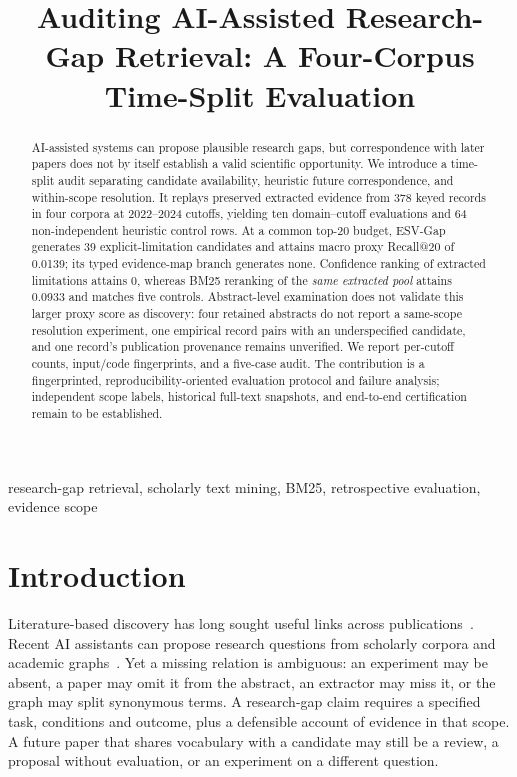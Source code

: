 \documentclass[conference,a4paper]{IEEEtran}
\title{Auditing AI-Assisted Research-Gap Retrieval: A Four-Corpus Time-Split Evaluation}
\author{\IEEEauthorblockN{L\^e Anh H\`oa}
\IEEEauthorblockA{FPT University, Vietnam\\
leanhhoa3002004@gmail.com}}
\begin{document}
\maketitle

\begin{abstract}
AI-assisted systems can propose plausible research gaps, but correspondence with later papers does not by itself establish a valid scientific opportunity. We introduce a time-split audit separating candidate availability, heuristic future correspondence, and within-scope resolution. It replays preserved extracted evidence from 378 keyed records in four corpora at 2022--2024 cutoffs, yielding ten domain--cutoff evaluations and 64 non-independent heuristic control rows. At a common top-20 budget, ESV-Gap generates 39 explicit-limitation candidates and attains macro proxy Recall@20 of 0.0139; its typed evidence-map branch generates none. Confidence ranking of extracted limitations attains 0, whereas BM25 reranking of the \emph{same extracted pool} attains 0.0933 and matches five controls. Abstract-level examination does not validate this larger proxy score as discovery: four retained abstracts do not report a same-scope resolution experiment, one empirical record pairs with an underspecified candidate, and one record's publication provenance remains unverified. We report per-cutoff counts, input/code fingerprints, and a five-case audit. The contribution is a fingerprinted, reproducibility-oriented evaluation protocol and failure analysis; independent scope labels, historical full-text snapshots, and end-to-end certification remain to be established.
\end{abstract}

\begin{IEEEkeywords}
research-gap retrieval, scholarly text mining, BM25, retrospective evaluation, evidence scope
\end{IEEEkeywords}

\section{Introduction}
Literature-based discovery has long sought useful links across publications~\cite{swanson1986}. Recent AI assistants can propose research questions from scholarly corpora and academic graphs~\cite{baek2025}. Yet a missing relation is ambiguous: an experiment may be absent, a paper may omit it from the abstract, an extractor may miss it, or the graph may split synonymous terms. A research-gap claim requires a specified task, conditions and outcome, plus a defensible account of evidence in that scope. A future paper that shares vocabulary with a candidate may still be a review, a proposal without evaluation, or an experiment on a different question.
\end{document}
